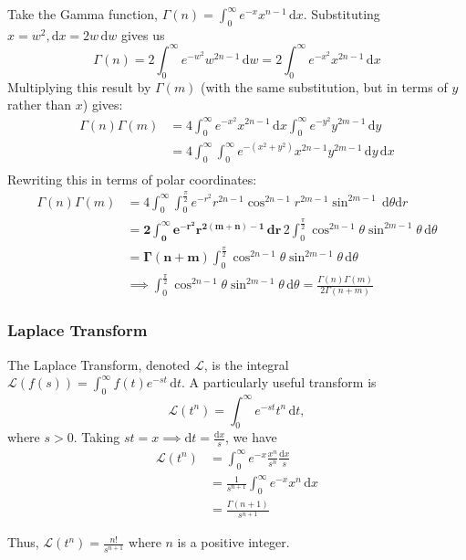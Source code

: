 \documentclass[12pt]{article}
\begin{document}
{Take the Gamma function, $\Gamma(n) = \int_{0}^{\infty} e^{-x} x^{n-1}\,\text{d}x$. Substituting $x = w^2, \text{d}x = 2w\, \text{d}w$ gives us \[\Gamma(n) = 2\int_0^\infty e^{-w^2} w^{2n-1} \, \text{d}w =2\int_0^\infty e^{-x^2} x^{2n-1} \, \text{d}x \] Multiplying this result by $\Gamma(m)$ (with the same substitution, but in terms of $y$ rather than $x$) gives: \begin{align*}
    \Gamma(n)\Gamma(m) &= 4 \int_{0}^{\infty} e^{-x^2} x^{2n-1} \, \text{d}x\int_0^\infty e^{-y^2} y^{2m-1} \, \text{d}y\\
    &= 4 \int_{0}^{\infty}\int_{0}^{\infty} e^{-(x^2+y^2)} x^{2n-1} y^{2m-1} \, \text{d}y\,\text{d}x\\
\end{align*}
Rewriting this in terms of polar coordinates:
\begin{align*}
    \Gamma(n)\Gamma(m) &= 4 \int_0^\infty \int_0^{\frac{\pi}{2}} e^{-r^2} r^{2n-1} \cos^{2n-1} r^{2m-1} \sin^{2m-1} \, \text{d}\theta\text{d}r\\
    &= \mathbf{2 \int_{0}^{\infty} e^{-r^2} r^{2(m+n)-1} \, \text{d}r }\, 2 \int_0^{\frac{\pi}{2}} \cos^{2n-1}\theta \sin^{2m-1} \theta \,\text{d}\theta\\
    &= \mathbf{\Gamma(n + m)} \int_0^{\frac{\pi}{2}} \cos^{2n-1}\theta \sin^{2m-1} \theta \,\text{d}\theta\\
    &\implies \int_0^{\frac{\pi}{2}} \cos^{2n-1}\theta \sin^{2m-1} \theta \,\text{d}\theta = \frac{\Gamma(n)\Gamma(m)}{2 \Gamma(n+m)}
\end{align*}
\subsubsection{Laplace Transform}

The Laplace Transform, denoted $\mathcal{L}$, is the integral $\mathcal{L}(f(s)) = \int_0^\infty f(t) e^{-st} \,\text{d}t$. A particularly useful transform is \[\mathcal{L}(t^n) = \int_0^\infty e^{-st}t^n\,\text{d}t,\] where $s>0$. Taking $st = x \implies \text{d}t = \frac{\text{d}x}{s}$, we have \begin{align*}
    \mathcal{L}(t^n) &= \int_0^\infty e^{-x} \frac{x^n}{s^n} \frac{\text{d}x}{s}\\
    &= \frac{1}{s^{n+1}} \int_0^\infty e^{-x} x^n \,\text{d}x\\
    &= \frac{\Gamma(n+1)}{s^{n+1}}
\end{align*}

Thus, $\mathcal{L}(t^n) = \frac{n!}{s^{n+1}}$ where $n$ is a positive integer.
}
\end{document}
